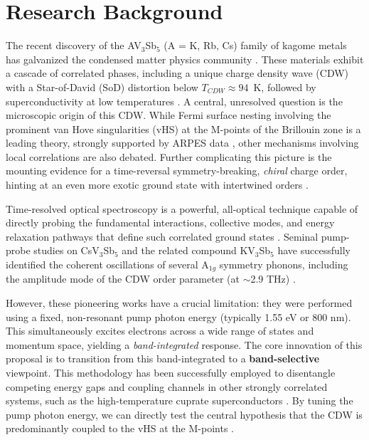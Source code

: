 \documentclass[12pt,a4paper]{article}
\begin{document}
\section{Research Background}
The recent discovery of the AV$_3$Sb$_5$ (A = K, Rb, Cs) family of kagome metals has galvanized the condensed matter physics community \cite{Ortiz2019, Wilson2021}. These materials exhibit a cascade of correlated phases, including a unique charge density wave (CDW) with a Star-of-David (SoD) distortion below $T_{CDW} \approx 94$~K, followed by superconductivity at low temperatures \cite{Neupert2022}. A central, unresolved question is the microscopic origin of this CDW. While Fermi surface nesting involving the prominent van Hove singularities (vHS) at the M-points of the Brillouin zone is a leading theory, strongly supported by ARPES data \cite{Kang2022}, other mechanisms involving local correlations are also debated. Further complicating this picture is the mounting evidence for a time-reversal symmetry-breaking, \textit{chiral} charge order, hinting at an even more exotic ground state with intertwined orders \cite{Jiang2021, Shrestha2023}.

Time-resolved optical spectroscopy is a powerful, all-optical technique capable of directly probing the fundamental interactions, collective modes, and energy relaxation pathways that define such correlated ground states \cite{Demsar2007, Giannetti2016}. Seminal pump-probe studies on CsV$_3$Sb$_5$ and the related compound KV$_3$Sb$_5$ have successfully identified the coherent oscillations of several A$_{1g}$ symmetry phonons, including the amplitude mode of the CDW order parameter (at $\sim$2.9 THz) \cite{Uykur2022}.

However, these pioneering works have a crucial limitation: they were performed using a fixed, non-resonant pump photon energy (typically 1.55 eV or 800 nm). This simultaneously excites electrons across a wide range of states and momentum space, yielding a \textit{band-integrated} response. The core innovation of this proposal is to transition from this band-integrated to a \textbf{band-selective} viewpoint. This methodology has been successfully employed to disentangle competing energy gaps and coupling channels in other strongly correlated systems, such as the high-temperature cuprate superconductors \cite{Coslovich2015, Giannetti2016}. By tuning the pump photon energy, we can directly test the central hypothesis that the CDW is predominantly coupled to the vHS at the M-points \cite{Miao2021, Liang2021}.
\end{document}
